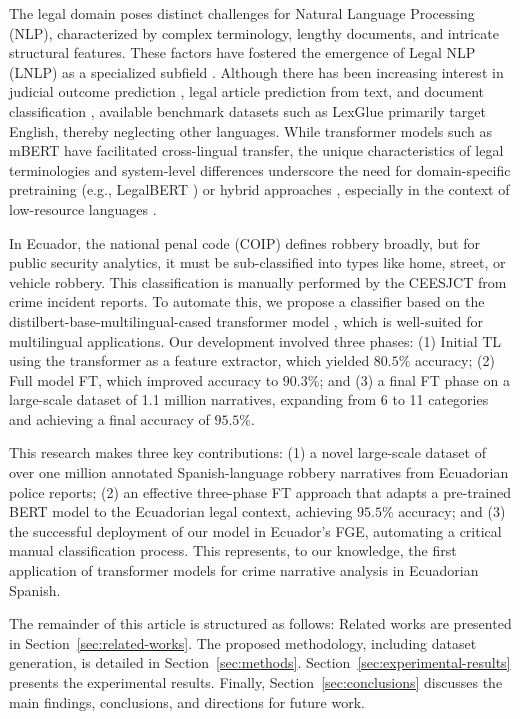 \documentclass[runningheads]{llncs}
\newcommand{\printInicialesComision}{CEESJCT}
\newcommand{\modelohuggingface}{distilbert-base-multilingual-cased}
\begin{document}
\newpage
The legal domain poses distinct challenges for Natural Language
Processing (NLP), characterized by complex terminology, lengthy
documents, and intricate structural features. These factors have
fostered the emergence of Legal NLP (LNLP) as a specialized subfield
\cite{Ariai2024,Zhong2020}. Although there has been increasing interest in
judicial outcome prediction
\cite{kalia2022classifying,mumcuouglu2021natural,wang2020deep}, legal
article prediction from text, and document classification
\cite{clavie2021,yan2019law}, available benchmark datasets such as
LexGlue primarily target English, thereby neglecting other
languages. While transformer models such as mBERT have facilitated
cross-lingual transfer, the unique characteristics of legal
terminologies and system-level differences underscore the need for
domain-specific pretraining (e.g., LegalBERT
\cite{chalkidis2020legal}) or hybrid approaches \cite{liu2022legal},
especially in the context of low-resource languages
\cite{savelka2021cross}.

In Ecuador, the national penal code (COIP) defines robbery broadly,
but for public security analytics, it must be sub-classified into
types like home, street, or vehicle robbery. This classification is
manually performed by the \printInicialesComision{} from crime
incident reports. To automate this, we propose a classifier based on
the \modelohuggingface{} transformer model
\cite{Sanh2019DistilBERTAD}, which is well-suited for multilingual
applications. Our development involved three phases: (1) Initial TL
using the transformer as a feature extractor, which yielded \(80.5\%\)
accuracy; (2) Full model FT, which improved accuracy to \(90.3\%\);
and (3) a final FT phase on a large-scale dataset of 1.1 million
narratives, expanding from 6 to 11 categories and achieving a final
accuracy of \(95.5\%\).

This research makes three key contributions: (1) a novel large-scale
dataset of over one million annotated Spanish-language robbery
narratives from Ecuadorian police reports; (2) an effective
three-phase FT approach that adapts a pre-trained BERT model to the
Ecuadorian legal context, achieving \(95.5\%\) accuracy; and (3) the
successful deployment of our model in Ecuador's FGE, automating a
critical manual classification process. This represents, to our
knowledge, the first application of transformer models for crime
narrative analysis in Ecuadorian Spanish.


The remainder of this article is structured as follows: Related works
are presented in Section~\ref{sec:related-works}. The proposed
methodology, including dataset generation, is detailed in
Section~\ref{sec:methods}. Section~\ref{sec:experimental-results}
presents the experimental results. Finally,
Section~\ref{sec:conclusions} discusses the main findings,
conclusions, and directions for future work.
\end{document}
